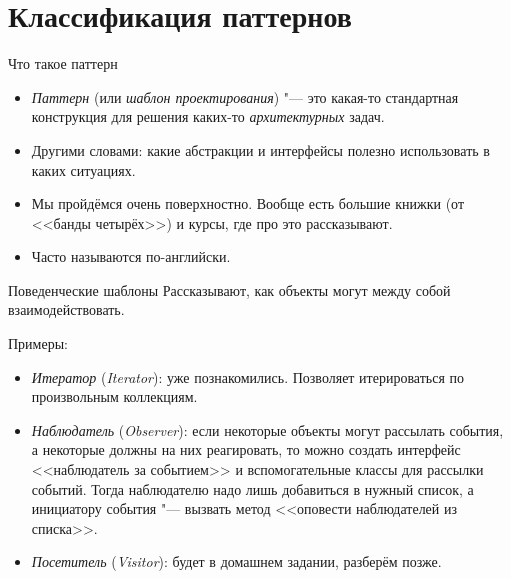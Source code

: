 \section{Классификация паттернов}

\begin{frame}
	\tableofcontents[currentsection]
\end{frame}

\begin{frame}{Что такое паттерн}
	\begin{itemize}
		\item
			\textit{Паттерн} (или \textit{шаблон проектирования}) "--- это какая-то стандартная конструкция для решения каких-то \textit{архитектурных} задач.
		\item
			Другими словами: какие абстракции и интерфейсы полезно использовать в каких ситуациях.
		\item
			Мы пройдёмся очень поверхностно.
			Вообще есть большие книжки (от <<банды четырёх>>) и курсы, где про это рассказывают.
		\item
			Часто называются по-английски.
	\end{itemize}
\end{frame}

\begin{frame}{Поведенческие шаблоны}
	Рассказывают, как объекты могут между собой взаимодействовать.

	Примеры:
	\begin{itemize}
		\item
			\textit{Итератор} (\textit{Iterator}): уже познакомились.
			Позволяет итерироваться по произвольным коллекциям.
		\item
			\textit{Наблюдатель} (\textit{Observer}): если некоторые объекты могут рассылать события, а некоторые
			должны на них реагировать, то можно создать интерфейс <<наблюдатель за событием>> и вспомогательные классы
			для рассылки событий.
			Тогда наблюдателю надо лишь добавиться в нужный список, а инициатору события "--- вызвать метод <<оповести наблюдателей из списка>>.
		\item
			\textit{Посетитель} (\textit{Visitor}): будет в домашнем задании, разберём позже.
	\end{itemize}
\end{frame}

